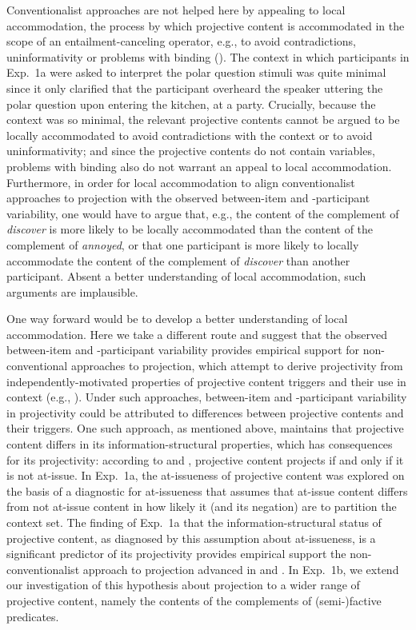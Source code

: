 \documentclass[11pt,fleqn]{article}
\newcommand{\6}{\mbox{$[\hspace*{-.6mm}[$}}
\newcommand{\9}{\mbox{$]\hspace*{-.6mm}]$}}
\begin{document}
Conventionalist approaches are not helped here by appealing to local accommodation, the process by which projective content is accommodated in the scope of an entailment-canceling operator, e.g., to avoid contradictions, uninformativity or problems with binding (\citealt{heim83,vds92}). The context in which participants in Exp.~1a were asked to interpret the polar question stimuli was quite minimal since it only clarified that the participant overheard the speaker uttering the polar question upon entering the kitchen, at a party. Crucially, because the context was so minimal, the relevant projective contents cannot be argued to be locally accommodated to avoid contradictions with the context or to avoid uninformativity; and since the projective contents do not contain variables, problems with binding also do not warrant an appeal to local accommodation. Furthermore, in order for local accommodation to align conventionalist approaches to projection with the observed between-item and -participant variability, one would have to argue that, e.g., the content of the complement of {\em discover} is more likely to be locally accommodated than the content of the complement of {\em annoyed}, or that one participant is more likely to locally accommodate the content of the complement of {\em discover} than another participant. Absent a better understanding of local accommodation, such arguments are implausible. 

One way forward would be to develop a better understanding of local accommodation. Here we take a different route and suggest that the observed between-item and -participant variability provides empirical support for non-conventional approaches to projection, which attempt to derive projectivity from independently-motivated properties of projective content triggers and their use in context (e.g., \citealt{stalnaker74,kempson75,wilson75,boer-lycan76,levinson83,kadmon01,simons01,simons04,atlas05,abusch10,abrusan2011,best-question}). Under such approaches, between-item and -participant variability in projectivity could be attributed to differences between projective contents and their triggers. One such approach, as mentioned above, maintains that projective content differs in its information-structural properties, which has consequences for its projectivity: according to \citealt{brst-salt10} and \citealt{brst-ar}, projective content projects if and only if it is not at-issue. In Exp.~1a, the at-issueness of projective content was explored on the basis of a diagnostic for at-issueness that assumes that at-issue content differs from not at-issue content in how likely it (and its negation) are to partition the context set. The finding of Exp.~1a that the information-structural status of projective content, as diagnosed by this assumption about at-issueness, is a significant predictor of its projectivity provides empirical support the non-conventionalist approach to projection advanced in \citealt{brst-salt10} and \citealt{brst-ar}. In Exp.~1b, we extend our investigation of this hypothesis about projection to a wider range of projective content, namely the contents of the complements of (semi-)factive predicates.
\end{document}
